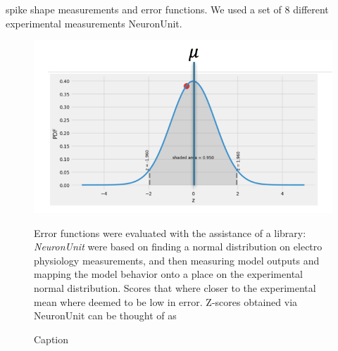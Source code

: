 spike shape measurements and error functions. We used a set of 8 different experimental measurements NeuronUnit.


\begin{figure}
	\includegraphics[]{figures/normal_distribution}
    \caption{Error functions were evaluated with the assistance of a library: \emph{NeuronUnit} 
    were based on finding a normal distribution on electro physiology measurements, 
    and then measuring model outputs and mapping the model behavior onto
     a place on the experimental normal distribution. Scores that where closer to the
      experimental mean where deemed to be low in error.
	Z-scores obtained via NeuronUnit can be thought of as  }
	
\caption{Caption}
	
\end{figure}
